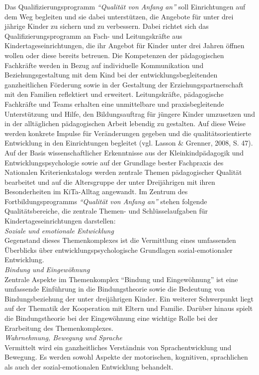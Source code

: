 \documentclass[12pt,a4paper]{article}
\begin{document}
Das Qualifizierungsprogramm \textit{"`Qualität von Anfang an"'} soll Einrichtungen auf dem Weg begleiten und sie dabei unterstützen, die Angebote für unter drei jährige Kinder zu sichern und zu verbessern. Dabei richtet sich das Qualifizierungsprogramm an Fach- und Leitungskräfte aus Kindertageseinrichtungen, die ihr Angebot für Kinder unter drei Jahren öffnen wollen oder diese bereits betreuen. Die Kompetenzen der pädagogischen Fachkräfte werden in Bezug auf individuelle Kommunikation und Beziehungsgestaltung mit dem Kind bei der entwicklungsbegleitenden ganzheitlichen Förderung sowie in der Gestaltung der Erziehungspartnerschaft mit den Familien reflektiert und erweitert. Leitungskräfte, pädagogische Fachkräfte und Teams erhalten eine unmittelbare und praxisbegleitende Unterstützung und Hilfe, den Bildungsauftrag für jüngere Kinder umzusetzen und in der alltäglichen pädagogischen Arbeit lebendig zu gestalten. Auf diese Weise werden konkrete Impulse für Veränderungen gegeben und die qualitätsorientierte Entwicklung in den Einrichtungen begleitet (vgl. Lasson \& Grenner, 2008, S. 47). Auf der Basis wissenschaftlicher Erkenntnisse aus der Kleinkindpädagogik und Entwicklungspsychologie sowie auf der Grundlage bester Fachpraxis des Nationalen Kriterienkatalogs werden zentrale Themen pädagogischer Qualität bearbeitet und auf die Altersgruppe der unter Dreijährigen mit ihren Besonderheiten im KiTa-Alltag angewandt. Im Zentrum des Fortbildungsprogramms \textit{"`Qualität von Anfang an"'} stehen folgende Qualitätsbereiche, die zentrale Themen- und Schlüsselaufgaben für Kindertageseinrichtungen darstellen:\\

\textit{Soziale und emotionale Entwicklung}\\
Gegenstand dieses Themenkomplexes ist die Vermittlung eines umfassenden Überblicks über entwicklungspsychologische Grundlagen sozial-emotionaler Entwicklung.\\

\textit{Bindung und Eingewöhnung}\\
Zentrale Aspekte im Themenkomplex "`Bindung und Eingewöhnung"' ist eine umfassende Einführung in die Bindungstheorie sowie die Bedeutung von Bindungsbeziehung der unter dreijährigen Kinder. Ein weiterer Schwerpunkt liegt auf der Thematik der Kooperation mit Eltern und Familie. Darüber hinaus spielt die Bindungstheorie bei der Eingewöhnung eine wichtige Rolle bei der Erarbeitung des Themenkomplexes.\\

\textit{Wahrnehmung, Bewegung und Sprache }\\
Vermittelt wird ein ganzheitliches Verständnis von Sprachentwicklung und Bewegung. Es werden sowohl Aspekte der motorischen, kognitiven, sprachlichen als auch der sozial-emotionalen Entwicklung behandelt.\\
\end{document}
